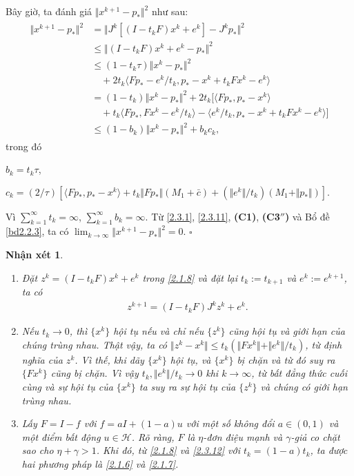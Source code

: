 \documentclass[14pt, oneside,A4paper]{book}
\theoremstyle{plain}
\newcommand{\eproof}{\hfill $\square$}
\newtheorem{nx}[theorem]{\bf Nhận xét}
\begin{document}
Bây giờ, ta đánh giá $\Vert x^{k+1}-p_{*}\Vert^{2}$ như sau:
\begin{align} \label{2.3.11}
\begin{split}
\Vert x^{k+1}-p_{*}\Vert^{2}&= \Vert J^{k}[(I-t_{k}F)x^{k}+e^{k}]-J^{k}p_{*}\Vert^{2} \\
& \leq \Vert (I-t_{k}F)x^{k}+e^{k}-p_{*}\Vert^{2} \\
& \leq (1-t_{k}\tau)\Vert x^{k}-p_{*}\Vert^{2}\\&\quad+2t_{k}\langle Fp_{*}-e^{k}/t_{k},p_{*}-x^{k}+t_{k}Fx^{k}-e^{k}\rangle \\
&= (1-t_{k})\Vert x^{k}-p_{*}\Vert^{2}+2t_{k}[\langle Fp_{*},p_{*}-x^{k}\rangle\\&\quad+t_{k}\langle Fp_{*},Fx^{k}-e^{k}/t_{k} \rangle - \langle e^{k}/t_{k},p_{*}-x^{k}+t_{k}Fx^{k}-e^{k} \rangle] \\
& \leq (1-b_{k})\Vert x^{k}-p_{*}\Vert^{2}+b_{k}c_{k},
\end{split}
\end{align}
trong đó 

$b_{k}=t_{k}\tau$,

$c_{k}=(2/\tau)[\langle Fp_{*},p_{*}-x^{k}\rangle+t_{k}\Vert Fp_{*}\Vert(M_{1}+\bar{c})+(\Vert e^{k} \Vert /t_{k})(M_{1}+\Vert p_{*} \Vert)].$


Vì $\sum_{k=1}^{\infty}t_{k}=\infty$, $\sum_{k=1}^{\infty}b_{k}=\infty$. Từ \eqref{2.3.1}, \eqref{2.3.11}, {\bf (C1)}, {\bf ({C3}$''$)} và Bổ đề \ref{bd2.2.3}, ta có $\lim_{k\rightarrow\infty} \Vert x^{k+1}-p_{*}\Vert^{2}=0$.
\eproof

\begin{nx}\rm \begin{enumerate}
\item[(a)] Đặt $z^{k}=(I-t_{k}F)x^{k}+e^{k}$ trong \eqref{2.1.8} và đặt lại $t_{k}:=t_{k+1}$ và $e^{k}:=e^{k+1}$, ta có
\begin{align}\label{2.3.12}
z^{k+1}=(I-t_{k}F)J^{k}z^{k}+e^{k}.
\end{align}
\item[(b)] Nếu $t_{k}\rightarrow 0$, thì $\lbrace x^{k} \rbrace$ hội tụ nếu và chỉ nếu $\lbrace z^{k} \rbrace$ cũng hội tụ và giới hạn của chúng trùng nhau. Thật vậy, ta có $\Vert z^{k}-x^{k}\Vert \leq t_{k}(\Vert Fx^{k}\Vert+\Vert e^{k}\Vert/t_{k})$, từ định nghĩa của $z^{k}$. Vì thế, khi dãy $\lbrace x^{k} \rbrace$ hội tụ, và $\lbrace x^{k} \rbrace$ bị chặn và từ đó suy ra $\lbrace Fx^{k} \rbrace$ cũng bị chặn. Vì vậy $t_{k},\Vert e^{k}\Vert/t_{k}\rightarrow 0$ khi $k\rightarrow \infty$, từ bất đẳng thức cuối cùng và sự hội tụ của $\lbrace x^{k} \rbrace$ ta suy ra sự hội tụ của $\lbrace z^{k} \rbrace$ và chúng có giới hạn trùng nhau. 
\item[(c)] Lấy $F=I-f$ với $f=aI+(1-a)u$ với một số không đổi $a\in(0,1)$ và một điểm bất động $u\in \mathcal H$. Rõ ràng, $F$ là $\eta$-đơn điệu mạnh và $\gamma$-giả co chặt sao cho $\eta+\gamma>1$. Khi đó, từ \eqref{2.1.8} và \eqref{2.3.12} với $t_{k}=(1-a)t_{k}$, ta được hai phương pháp là \eqref{2.1.6} và \eqref{2.1.7}.
	\end{enumerate}
\end{nx}
\end{document}
